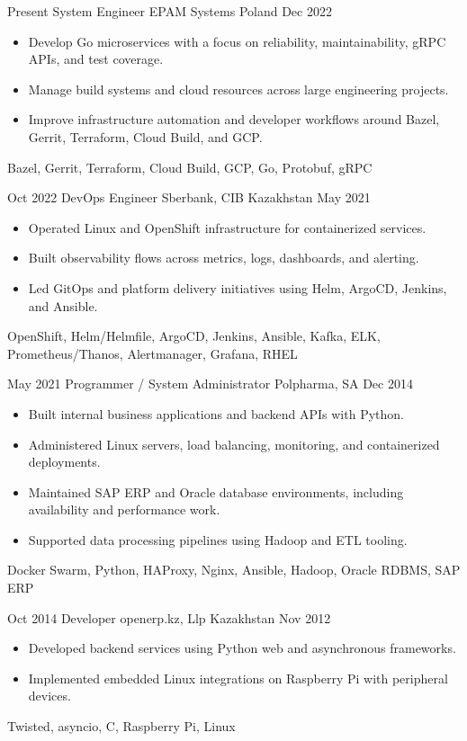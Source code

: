 \documentclass[localFont,alternative,10pt,compact]{yaac-another-awesome-cv}
\begin{document}
\begin{experiences}
  \experience
  {Present}
  {System Engineer}
  {EPAM Systems}
  {Poland}
  {Dec 2022}
  {
    \begin{itemize}
      \item Develop Go microservices with a focus on reliability, maintainability, gRPC APIs, and test coverage.
      \item Manage build systems and cloud resources across large engineering projects.
      \item Improve infrastructure automation and developer workflows around Bazel, Gerrit, Terraform, Cloud Build, and GCP.
    \end{itemize}
  }
  {Bazel, Gerrit, Terraform, Cloud Build, GCP, Go, Protobuf, gRPC}

  \emptySeparator

  \experience
  {Oct 2022}
  {DevOps Engineer}
  {Sberbank, CIB}
  {Kazakhstan}
  {May 2021}
  {
    \begin{itemize}
      \item Operated Linux and OpenShift infrastructure for containerized services.
      \item Built observability flows across metrics, logs, dashboards, and alerting.
      \item Led GitOps and platform delivery initiatives using Helm, ArgoCD, Jenkins, and Ansible.
    \end{itemize}
  }
  {OpenShift, Helm/Helmfile, ArgoCD, Jenkins, Ansible, Kafka, ELK, Prometheus/Thanos, Alertmanager, Grafana, RHEL}

  \emptySeparator

  \experience
  {May 2021}
  {Programmer / System Administrator}
  {Polpharma, SA}
  {}
  {Dec 2014}
  {
    \begin{itemize}
      \item Built internal business applications and backend APIs with Python.
      \item Administered Linux servers, load balancing, monitoring, and containerized deployments.
      \item Maintained SAP ERP and Oracle database environments, including availability and performance work.
      \item Supported data processing pipelines using Hadoop and ETL tooling.
    \end{itemize}
  }
  {Docker Swarm, Python, HAProxy, Nginx, Ansible, Hadoop, Oracle RDBMS, SAP ERP}

  \emptySeparator

  \experience
  {Oct 2014}
  {Developer}
  {openerp.kz, Llp}
  {Kazakhstan}
  {Nov 2012}
  {
    \begin{itemize}
      \item Developed backend services using Python web and asynchronous frameworks.
      \item Implemented embedded Linux integrations on Raspberry Pi with peripheral devices.
    \end{itemize}
  }
  {Twisted, asyncio, C, Raspberry Pi, Linux}
\end{experiences}
\end{document}
